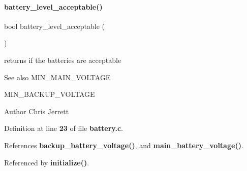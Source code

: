\paragraph{battery\+\_\+level\+\_\+acceptable()}
{\footnotesize\ttfamily bool battery\+\_\+level\+\_\+acceptable (\begin{DoxyParamCaption}{ }\end{DoxyParamCaption})}



returns if the batteries are acceptable 

\begin{DoxySeeAlso}{See also}
M\+I\+N\+\_\+\+M\+A\+I\+N\+\_\+\+V\+O\+L\+T\+A\+GE 

M\+I\+N\+\_\+\+B\+A\+C\+K\+U\+P\+\_\+\+V\+O\+L\+T\+A\+GE
\end{DoxySeeAlso}
\begin{DoxyAuthor}{Author}
Chris Jerrett 
\end{DoxyAuthor}


Definition at line \textbf{ 23} of file \textbf{ battery.\+c}.



References \textbf{ backup\+\_\+battery\+\_\+voltage()}, and \textbf{ main\+\_\+battery\+\_\+voltage()}.



Referenced by \textbf{ initialize()}.


